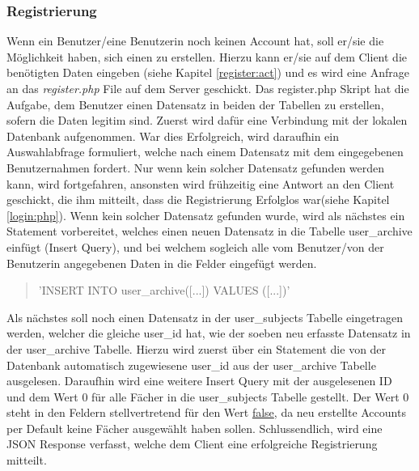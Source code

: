 \documentclass[a4paper,11pt]{report}
\begin{document}
					\subsubsection{Registrierung}
					Wenn ein Benutzer/eine Benutzerin noch keinen Account hat, soll er/sie die Möglichkeit haben, sich einen zu erstellen. Hierzu kann er/sie auf dem Client die benötigten Daten eingeben (siehe Kapitel \ref{register:act}) und es wird eine Anfrage an das \emph{register.php} File auf dem Server geschickt. Das register.php Skript hat die Aufgabe, dem Benutzer einen Datensatz in beiden der Tabellen zu erstellen, sofern die Daten legitim sind. Zuerst wird dafür eine Verbindung mit der lokalen Datenbank aufgenommen. War dies Erfolgreich, wird daraufhin ein Auswahlabfrage formuliert, welche nach einem Datensatz mit dem eingegebenen Benutzernahmen fordert. Nur wenn kein solcher Datensatz gefunden werden kann, wird fortgefahren, ansonsten wird frühzeitig eine Antwort an den Client geschickt, die ihm mitteilt, dass die Registrierung Erfolglos war(siehe Kapitel \ref{login:php}). Wenn kein solcher Datensatz gefunden wurde, wird als nächstes ein Statement vorbereitet, welches einen neuen Datensatz in die Tabelle user\_archive einfügt (Insert Query), und bei welchem sogleich alle vom Benutzer/von der Benutzerin angegebenen Daten in die Felder eingefügt werden.
					\begin{quotation}
						{\selectfont\noindent 'INSERT INTO user\_archive([...]) VALUES ([...])'}
					\end{quotation}
					
					Als nächstes soll noch einen Datensatz in der user\_subjects Tabelle eingetragen werden, welcher die gleiche user\_id hat, wie der soeben neu erfasste Datensatz in der user\_archive Tabelle. Hierzu wird zuerst über ein Statement die von der Datenbank automatisch zugewiesene user\_id aus der user\_archive Tabelle ausgelesen. Daraufhin wird eine weitere Insert Query mit der ausgelesenen ID und dem Wert 0 für alle Fächer in die user\_subjects Tabelle gestellt. Der Wert 0 steht in den Feldern stellvertretend für den Wert \url{false}, da neu erstellte Accounts per Default keine Fächer ausgewählt haben sollen. Schlussendlich, wird eine JSON Response verfasst, welche dem Client eine erfolgreiche Registrierung mitteilt.
\end{document}
